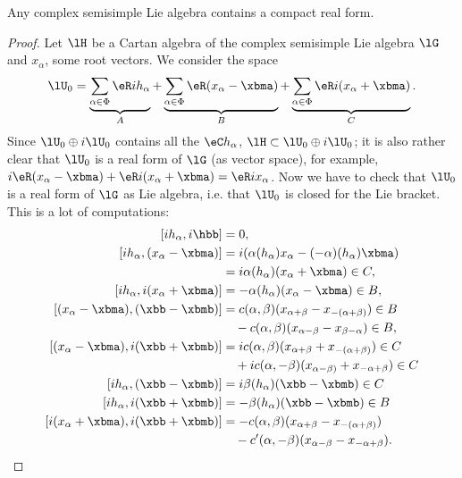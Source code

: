 \begin{theorem}
Any complex semisimple Lie algebra contains a compact real form.
\end{theorem}

\begin{proof}
Let $\lH$ be a Cartan algebra of the complex semisimple Lie algebra $\lG$ and $ x_{\alpha}$, some root vectors. We consider the space
\begin{equation}
 \lU_0=\underbrace{\sum_{\alpha\in\Phi}\eR ih_{\alpha}}_A+\underbrace{\sum_{\alpha\in\Phi}\eR( x_{\alpha}-\xbma)}_B+\underbrace{\sum_{\alpha\in\Phi}\eR i( x_{\alpha}+\xbma)}_C.
\end{equation}
Since $\lU_0\oplus i\lU_0$ contains all the $\eC h_{\alpha}$, $\lH\subset\lU_0\oplus i\lU_0$; it is also rather clear that $\lU_0$ is a real form of $\lG$ (as vector space), for example, $i\eR( x_{\alpha}-\xbma)+\eR i( x_{\alpha}+\xbma)=\eR i x_{\alpha}$. Now we have to check that $\lU_0$ is a real form of $\lG$ as Lie algebra, i.e. that $\lU_0$ is closed for the Lie bracket. This is a lot of computations:
\[
\begin{split}
[i h_{\alpha},i\hbb]               &=0,\\
[i h_{\alpha},( x_{\alpha}-\xbma)]        &=i(\alpha( h_{\alpha}) x_{\alpha}-(-\alpha)( h_{\alpha})\xbma)\\
                            &=i\alpha( h_{\alpha})( x_{\alpha}+\xbma)\in C,\\
[i h_{\alpha},i( x_{\alpha}+\xbma)]       &=-\alpha( h_{\alpha})( x_{\alpha}-\xbma)\in B,\\
[( x_{\alpha}-\xbma),(\xbb-\xbmb)] &=c(\alpha,\beta)( x_{\alpha+\beta}-x_{-(\alpha+\beta)} )\in B\\
                            &\quad -c(\alpha,\beta)(x_{\alpha-\beta}-x_{\beta-\alpha})\in B,\\
[( x_{\alpha}-\xbma),i(\xbb+\xbmb)]&=ic(\alpha,\beta)(x_{\alpha+\beta}+x_{-(\alpha+\beta)})\in C\\
                            &\quad +ic(\alpha,-\beta)(x_{\alpha-\beta)}+x_{-\alpha+\beta})\in C\\
[i h_{\alpha},(\xbb-\xbmb)]     &=i\beta( h_{\alpha})(\xbb-\xbmb)\in C\\
[i h_{\alpha},i(\xbb+\xbmb)]       &=-\beta( h_{\alpha})(\xbb-\xbmb)\in B\\
[i( x_{\alpha}+\xbma),i(\xbb+\xbmb)]&=-c(\alpha,\beta)(x_{\alpha+\beta}-x_{-(\alpha+\beta)})\\
                             &\quad -c'(\alpha,-\beta)(x_{\alpha-\beta}-x_{-\alpha+\beta}).
\end{split}
\]


\end{proof}
